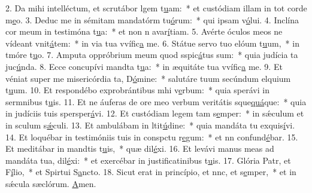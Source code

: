 2. Da mihi intelléctum, et scrutábor lgem t\uline{u}am:~* et custódiam illam in tot corde m\uline{e}o.
3. Deduc me in sémitam mandatórm tu\uline{ó}rum:~* qui ipsam v\uline{ó}lui.
4. Inclína cor meum in testimóna t\uline{u}a:~* et non n avar\uline{í}tiam.
5. Avérte óculos meos ne vídeant vnit\uline{á}tem:~* in via tua vvífic\uline{a} me.
6. Státue servo tuo elóum t\uline{u}um,~* in tmóre t\uline{u}o.
7. Amputa oppróbrium meum quod sspic\uline{á}tus sum:~* quia judícia ta juc\uline{ú}nda.
8. Ecce concupívi mandta t\uline{u}a:~* in æquitáte tua vvífic\uline{a} me.
9. Et véniat super me misericórdia ta, D\uline{ó}mine:~* salutáre tuum secúndum elquium t\uline{u}um.
10. Et respondébo exprobrántibus mhi v\uline{e}rbum:~* quia sperávi in sermnibus t\uline{u}is.
11. Et ne áuferas de ore meo verbum veritátis sque\uline{quá}que:~* quia in judíciis tuis spersper\uline{á}vi.
12. Et custódiam legem tam s\uline{e}mper:~* in sǽculum et in sculum s\uline{ǽ}culi.
13. Et ambulábam in ltit\uline{ú}dine:~* quia mandáta tu exquis\uline{í}vi.
14. Et loquébar in testimóniis tuis in conspctu r\uline{e}gum:~* et nn confund\uline{é}bar.
15. Et meditábar in mandtis t\uline{u}is,~* quæ dil\uline{é}xi.
16. Et levávi manus meas ad mandáta tua,  dil\uline{é}xi:~* et exercébar in justificatinibus t\uline{u}is.
17. Glória Patr, et F\uline{í}lio,~* et Spirtui S\uline{a}ncto.
18. Sicut erat in princípio, et nnc, et s\uline{e}mper,~* et in sǽcula sæclórum. \uline{A}men.
